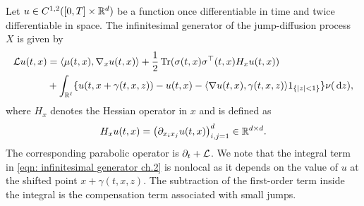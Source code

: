 Let $u \in C^{1,2}([0,T] \times \mathbb{R}^d)$ be a function once differentiable in time and twice differentiable in space. The infinitesimal generator of the jump-diffusion process $X$ is given by
\begin{align}
    \mathcal{L} u(t,x) &= \langle \mu(t,x), \nabla_x u(t,x) \rangle + \frac{1}{2} \operatorname{Tr} (\sigma(t,x)\sigma^\top(t,x)H_x u(t,x)) \nonumber\\
    &+ \int_{\mathbb{R}^\ell} \{u(t,x+\gamma(t,x,z)) - u(t,x) - \langle \nabla u(t,x), \gamma(t,x,z) \rangle 1_{\left\{|z|<1\right\}}\} \nu(\,\mathrm{d} z),
    \label{eqn: infinitesimal generator ch.2}
\end{align}
where $H_x$ denotes the Hessian operator in $x$ and is defined as
\begin{equation*}
    H_x u(t,x) = \big(\partial_{x_i x_j}u(t,x)\big)_{i,j=1}^d \in \mathbb{R}^{d \times d}.
\end{equation*}
The corresponding parabolic operator is $\partial_t + \mathcal{L}$. We note that the integral term in \eqref{eqn: infinitesimal generator ch.2} is nonlocal as it depends on the value of $u$ at the shifted point $x+\gamma(t,x,z)$. The subtraction of the first-order term inside the integral is the compensation term associated with small jumps.

